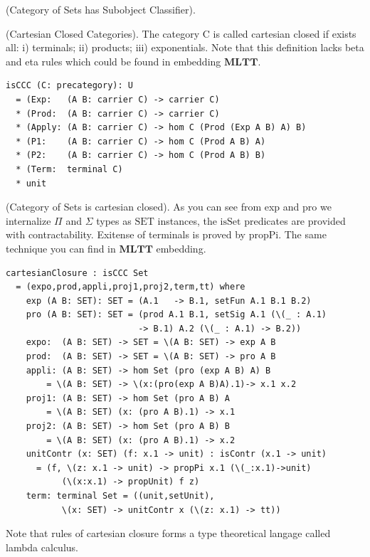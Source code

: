 \begin{definition}
\begin{theorem} (Category of Sets has Subobject Classifier).
\end{theorem}

\begin{definition} (Cartesian Closed Categories).
The category $\mathrm{C}$ is called cartesian closed if exists all:
i) terminals; ii) products; iii) exponentials. Note that this definition
lacks beta and eta rules which could be found in embedding $\mathbf{MLTT}$.
\begin{lstlisting}
isCCC (C: precategory): U
  = (Exp:   (A B: carrier C) -> carrier C)
  * (Prod:  (A B: carrier C) -> carrier C)
  * (Apply: (A B: carrier C) -> hom C (Prod (Exp A B) A) B)
  * (P1:    (A B: carrier C) -> hom C (Prod A B) A)
  * (P2:    (A B: carrier C) -> hom C (Prod A B) B)
  * (Term:  terminal C)
  * unit
\end{lstlisting}
\end{definition}

\begin{theorem} (Category of Sets is cartesian closed).
As you can see from exp and pro we internalize $\Pi$ and $\Sigma$ types as $\mathrm{SET}$ instances,
the $\mathrm{isSet}$ predicates are provided with contractability.
Exitense of terminals is proved by $\mathrm{propPi}$. The same technique you
can find in $\mathbf{MLTT}$ embedding.
\begin{lstlisting}
cartesianClosure : isCCC Set
  = (expo,prod,appli,proj1,proj2,term,tt) where
    exp (A B: SET): SET = (A.1   -> B.1, setFun A.1 B.1 B.2)
    pro (A B: SET): SET = (prod A.1 B.1, setSig A.1 (\(_ : A.1)
                          -> B.1) A.2 (\(_ : A.1) -> B.2))
    expo:  (A B: SET) -> SET = \(A B: SET) -> exp A B
    prod:  (A B: SET) -> SET = \(A B: SET) -> pro A B
    appli: (A B: SET) -> hom Set (pro (exp A B) A) B
        = \(A B: SET) -> \(x:(pro(exp A B)A).1)-> x.1 x.2
    proj1: (A B: SET) -> hom Set (pro A B) A
        = \(A B: SET) (x: (pro A B).1) -> x.1
    proj2: (A B: SET) -> hom Set (pro A B) B
        = \(A B: SET) (x: (pro A B).1) -> x.2
    unitContr (x: SET) (f: x.1 -> unit) : isContr (x.1 -> unit)
      = (f, \(z: x.1 -> unit) -> propPi x.1 (\(_:x.1)->unit)
           (\(x:x.1) -> propUnit) f z)
    term: terminal Set = ((unit,setUnit),
           \(x: SET) -> unitContr x (\(z: x.1) -> tt))
\end{lstlisting}
Note that rules of cartesian closure forms a type theoretical langage
called lambda calculus.
\end{theorem}


\end{definition}
